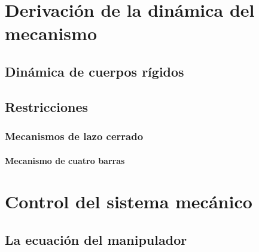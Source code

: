 \chapter{Derivación de la dinámica del mecanismo}

\section{Dinámica de cuerpos rígidos}

\section{Restricciones}
\subsection{Mecanismos de lazo cerrado}
\subsubsection{Mecanismo de cuatro barras}

\chapter{Control del sistema mecánico}

\section{La ecuación del manipulador}